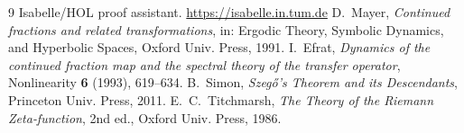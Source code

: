 \documentclass[11pt,a4paper]{article}
\theoremstyle{definition}
\begin{document}
\begin{thebibliography}{9}
Isabelle/HOL proof assistant. \url{https://isabelle.in.tum.de}
D.~Mayer, \emph{Continued fractions and related transformations}, in: Ergodic Theory, Symbolic Dynamics, and Hyperbolic Spaces, Oxford Univ. Press, 1991.
I.~Efrat, \emph{Dynamics of the continued fraction map and the spectral theory of the transfer operator}, Nonlinearity \textbf{6} (1993), 619--634.
B.~Simon, \emph{Szegő's Theorem and its Descendants}, Princeton Univ. Press, 2011.
E.~C.~Titchmarsh, \emph{The Theory of the Riemann Zeta‑function}, 2nd ed., Oxford Univ. Press, 1986.
\end{thebibliography}
\end{document}
